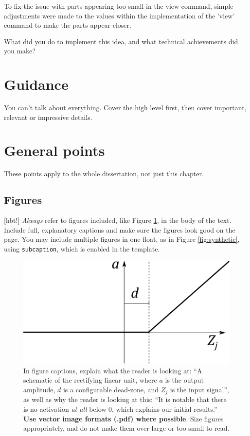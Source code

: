 \documentclass{l4proj}
\begin{document}
To fix the issue with parts appearing too small in the view command, simple adjustments were made to the values within the implementation of the 'view' command to make the parts appear closer.

What did you do to implement this idea, and what technical achievements did you make?
\section{Guidance}
You can't talk about everything. Cover the high level first, then cover important, relevant or impressive details.



\section{General points}

These points apply to the whole dissertation, not just this chapter.



\subsection{Figures}[hbt!]
\emph{Always} refer to figures included, like Figure \ref{fig:relu}, in the body of the text. Include full, explanatory captions and make sure the figures look good on the page.
You may include multiple figures in one float, as in Figure \ref{fig:synthetic}, using \texttt{subcaption}, which is enabled in the template.



\begin{figure}[hbt!]
    \centering
    \includegraphics[width=0.5\linewidth]{images/relu.pdf}    

    \caption{In figure captions, explain what the reader is looking at: ``A schematic of the rectifying linear unit, where $a$ is the output amplitude,
    $d$ is a configurable dead-zone, and $Z_j$ is the input signal'', as well as why the reader is looking at this: 
    ``It is notable that there is no activation \emph{at all} below 0, which explains our initial results.'' 
    \textbf{Use vector image formats (.pdf) where possible}. Size figures appropriately, and do not make them over-large or too small to read.
    }

    \label{fig:relu} 
\end{figure}
\end{document}

